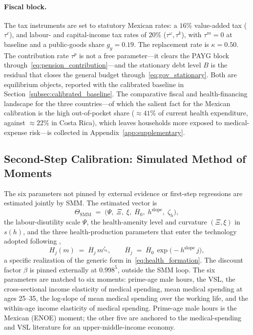 \documentclass[12pt,a4paper]{article}
\begin{document}
\paragraph{Fiscal block.}
The tax instruments are set to statutory Mexican rates: a $16\%$ value-added tax ($\tau^c$), and labour- and capital-income tax rates of $20\%$ ($\tau^\omega,\tau^k$), with $\tau^m=0$ at baseline and a public-goods share $g_y=0.19$. The replacement rate is $\kappa=0.50$. The contribution rate $\tau^p$ is not a free parameter---it clears the PAYG block through~\eqref{eq:pension_contribution}---and the stationary debt level $B$ is the residual that closes the general budget through~\eqref{eq:gov_stationary}. Both are equilibrium objects, reported with the calibrated baseline in Section~\ref{subsec:calibrated_baseline}. The comparative fiscal and health-financing landscape for the three countries---of which the salient fact for the Mexican calibration is the high out-of-pocket share ($\approx 41\%$ of current health expenditure, against $\approx 22\%$ in Costa Rica), which leaves households more exposed to medical-expense risk---is collected in Appendix~\ref{app:supplementary}.

\subsection{Second-Step Calibration: Simulated Method of Moments}
\label{subsec:secondstep_smm}

The six parameters not pinned by external evidence or first-step regressions are estimated jointly by SMM. The estimated vector is
\[
\Theta_{\mathrm{SMM}} \;=\; \bigl(\Psi,\; \Xi,\; \xi,\; \overline{H}_0,\; h^{\mathrm{slope}},\; \zeta_h\bigr),
\]
the labour-disutility scale $\Psi$, the health-amenity level and curvature $(\Xi,\xi)$ in $s(h)$, and the three health-production parameters that enter the technology adopted following \citet{Carrasco2026},
\begin{equation}
\label{eq:healthproduction}
H_{j}(m) \;=\; \overline{H}_{j}\, m^{\zeta_{h}}, \qquad \overline{H}_{j} \;=\; \overline{H}_{0}\,\exp\bigl(-h^{\mathrm{slope}}\, j\bigr),
\end{equation}
a specific realization of the generic form in~\eqref{eq:health_formation}. The discount factor $\beta$ is pinned externally at $0.998^5$, outside the SMM loop. The six parameters are matched to six moments: prime-age male hours, the VSL, the cross-sectional income elasticity of medical spending, mean medical spending at ages 25--35, the log-slope of mean medical spending over the working life, and the within-age income elasticity of medical spending. Prime-age male hours is the Mexican (ENOE) moment; the other five are anchored to the medical-spending and VSL literature for an upper-middle-income economy.
\end{document}
